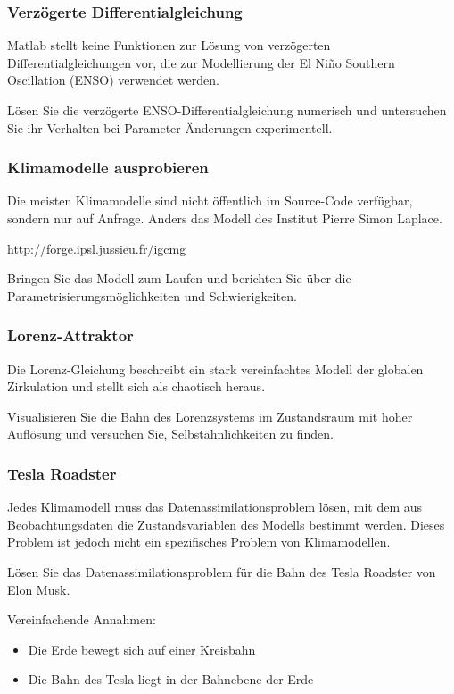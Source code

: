 \begin{frame}
\frametitle{Verzögerte Differentialgleichung}
Matlab stellt keine Funktionen zur Lösung von verzögerten
Differentialgleichungen vor, die zur Modellierung der
El Niño Southern Oscillation (ENSO) verwendet werden.
\begin{aufgabe}
Lösen Sie die verzögerte ENSO-Differentialgleichung numerisch und
untersuchen Sie ihr Verhalten bei Parameter-Änderungen experimentell.
\end{aufgabe}
\end{frame}

\begin{frame}
\frametitle{Klimamodelle ausprobieren}

Die meisten Klimamodelle sind nicht öffentlich im Source-Code verfügbar,
sondern nur auf Anfrage.
Anders das Modell des Institut Pierre Simon Laplace.

\url{http://forge.ipsl.jussieu.fr/igcmg}

\begin{aufgabe}
Bringen Sie das Modell zum Laufen und berichten Sie über die 
Parametrisierungsmöglichkeiten und
Schwierigkeiten.
\end{aufgabe}
\end{frame}

\begin{frame}
\frametitle{Lorenz-Attraktor}

Die Lorenz-Gleichung beschreibt ein stark vereinfachtes Modell der
globalen Zirkulation und stellt sich als chaotisch heraus.

\begin{aufgabe}
Visualisieren Sie die Bahn des Lorenzsystems im Zustandsraum
mit hoher Auflösung und versuchen Sie, Selbstähnlichkeiten zu finden.
\end{aufgabe}

\end{frame}

\begin{frame}
\frametitle{Tesla Roadster}

Jedes Klimamodell muss das Datenassimilationsproblem lösen, mit dem
aus Beobachtungsdaten die Zustandsvariablen des Modells bestimmt werden.
Dieses Problem ist jedoch nicht ein spezifisches Problem von Klimamodellen.

\begin{aufgabe}
Lösen Sie das Datenassimilationsproblem für die Bahn des Tesla Roadster von
Elon Musk.
\end{aufgabe}

Vereinfachende Annahmen:
\begin{itemize}
\item Die Erde bewegt sich auf einer Kreisbahn
\item Die Bahn des Tesla liegt in der Bahnebene der Erde
\end{itemize}

\end{frame}


